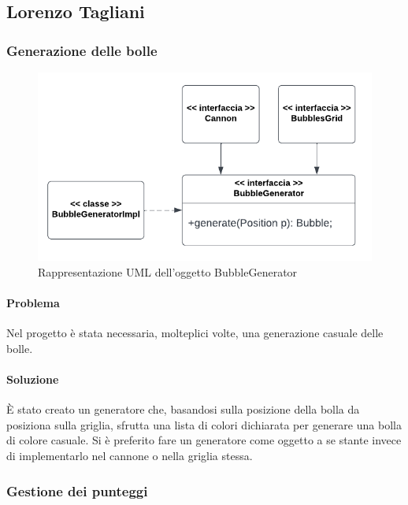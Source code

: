\documentclass[a4paper,12pt]{report}
\begin{document}
\subsection{Lorenzo Tagliani}
\subsubsection{Generazione delle bolle}

\begin{figure}[H]
	\centering{}
	\includegraphics[width=\textwidth]{img/bubblegenerator.pdf}
	\caption{Rappresentazione UML dell'oggetto BubbleGenerator}
\end{figure}

\paragraph{Problema} Nel progetto è stata necessaria, molteplici volte, una generazione casuale delle bolle.

\paragraph{Soluzione} È stato creato un generatore che, basandosi sulla posizione della bolla da posiziona sulla griglia, sfrutta una lista di colori dichiarata per generare
una bolla di colore casuale.
Si è preferito fare un generatore come oggetto a se stante invece di implementarlo nel cannone o nella griglia stessa.

\subsubsection{Gestione dei punteggi}
\end{document}
